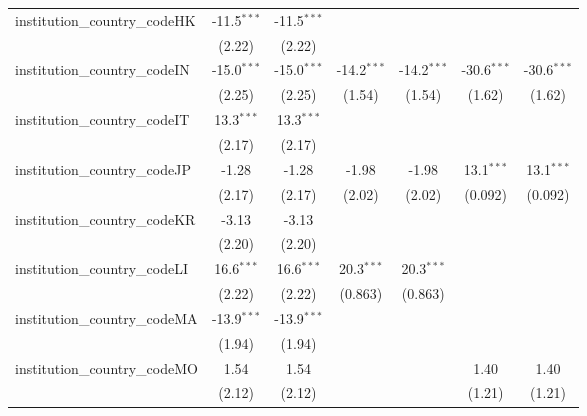 \begin{tabular}{lcccccc}
   institution\_country\_codeHK          & -11.5$^{***}$ & -11.5$^{***}$ &               &               &               &   \\   
                                         & (2.22)        & (2.22)        &               &               &               &   \\   
   institution\_country\_codeIN          & -15.0$^{***}$ & -15.0$^{***}$ & -14.2$^{***}$ & -14.2$^{***}$ & -30.6$^{***}$ & -30.6$^{***}$\\   
                                         & (2.25)        & (2.25)        & (1.54)        & (1.54)        & (1.62)        & (1.62)\\   
   institution\_country\_codeIT          & 13.3$^{***}$  & 13.3$^{***}$  &               &               &               &   \\   
                                         & (2.17)        & (2.17)        &               &               &               &   \\   
   institution\_country\_codeJP          & -1.28         & -1.28         & -1.98         & -1.98         & 13.1$^{***}$  & 13.1$^{***}$\\   
                                         & (2.17)        & (2.17)        & (2.02)        & (2.02)        & (0.092)       & (0.092)\\   
   institution\_country\_codeKR          & -3.13         & -3.13         &               &               &               &   \\   
                                         & (2.20)        & (2.20)        &               &               &               &   \\   
   institution\_country\_codeLI          & 16.6$^{***}$  & 16.6$^{***}$  & 20.3$^{***}$  & 20.3$^{***}$  &               &   \\   
                                         & (2.22)        & (2.22)        & (0.863)       & (0.863)       &               &   \\   
   institution\_country\_codeMA          & -13.9$^{***}$ & -13.9$^{***}$ &               &               &               &   \\   
                                         & (1.94)        & (1.94)        &               &               &               &   \\   
   institution\_country\_codeMO          & 1.54          & 1.54          &               &               & 1.40          & 1.40\\   
                                         & (2.12)        & (2.12)        &               &               & (1.21)        & (1.21)\\   

\end{tabular}
